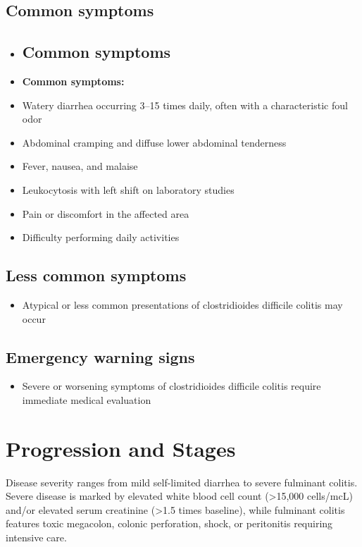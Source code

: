\subsection{Common symptoms}
\begin{itemize}[noitemsep]
  \item \subsection{Common symptoms}
  \item \textbf{Common symptoms:}
  \item Watery diarrhea occurring 3--15 times daily, often with a characteristic foul odor
  \item Abdominal cramping and diffuse lower abdominal tenderness
  \item Fever, nausea, and malaise
  \item Leukocytosis with left shift on laboratory studies
  \item Pain or discomfort in the affected area
  \item Difficulty performing daily activities
\end{itemize}

\subsection{Less common symptoms}
\begin{itemize}[noitemsep]
  \item Atypical or less common presentations of clostridioides difficile colitis may occur
\end{itemize}

\subsection{Emergency warning signs}
\begin{itemize}[noitemsep]
  \item Severe or worsening symptoms of clostridioides difficile colitis require immediate medical evaluation
\end{itemize}
\section{Progression and Stages}
Disease severity ranges from mild self-limited diarrhea to severe fulminant colitis. Severe disease is marked by elevated white blood cell count (>15,000 cells/mcL) and/or elevated serum creatinine (>1.5 times baseline), while fulminant colitis features toxic megacolon, colonic perforation, shock, or peritonitis requiring intensive care.


